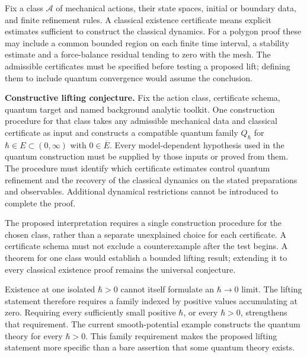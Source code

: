 \documentclass[11pt,a4paper]{article}
\begin{document}
Fix a class \(\mathcal A\) of mechanical actions, their state spaces,
initial or boundary data, and finite refinement rules. A classical
existence certificate means explicit estimates sufficient to construct
the classical dynamics. For a polygon proof these may include a common
bounded region on each finite time interval, a stability estimate and a
force-balance residual tending to zero with the mesh. The admissible
certificates must be specified before testing a proposed lift; defining
them to include quantum convergence would assume the conclusion.

\textbf{Constructive lifting conjecture.} Fix the action class,
certificate schema, quantum target and named background analytic
toolkit. One construction procedure for that class takes any admissible
mechanical data and classical certificate as input and constructs a
compatible quantum family \(Q_\hbar\) for
\(\hbar\in E\subset(0,\infty)\) with \(0\in\overline E\). Every
model-dependent hypothesis used in the quantum construction must be
supplied by those inputs or proved from them. The procedure must
identify which certificate estimates control quantum refinement and the
recovery of the classical dynamics on the stated preparations and
observables. Additional dynamical restrictions cannot be introduced to
complete the proof.

The proposed interpretation requires a single construction procedure for
the chosen class, rather than a separate unexplained choice for each
certificate. A certificate schema must not exclude a counterexample
after the test begins. A theorem for one class would establish a bounded
lifting result; extending it to every classical existence proof remains
the universal conjecture.

Existence at one isolated \(\hbar>0\) cannot itself formulate an
\(\hbar\to0\) limit. The lifting statement therefore requires a family
indexed by positive values accumulating at zero. Requiring every
sufficiently small positive \(\hbar\), or every \(\hbar>0\), strengthens
that requirement. The current smooth-potential example constructs the
quantum theory for every \(\hbar>0\). This family requirement makes the
proposed lifting statement more specific than a bare assertion that some
quantum theory exists.
\end{document}
